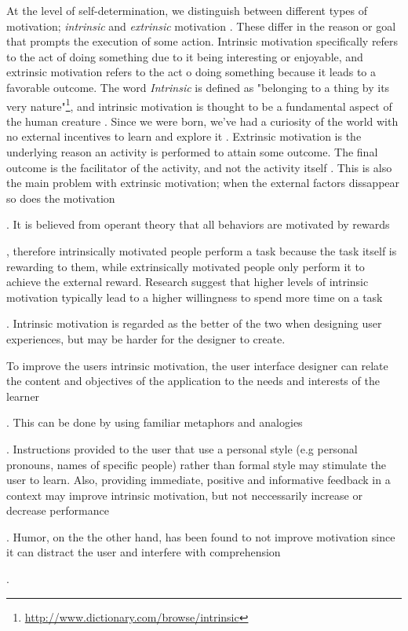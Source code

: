 At the level of self-determination, we distinguish between different types of motivation; \textit{intrinsic} and \textit{extrinsic} motivation \cite{Ryan2000a}. These differ in the reason or goal that prompts the execution of some action. Intrinsic motivation specifically refers to the act of doing something due to it being interesting or enjoyable, and extrinsic motivation refers to the act o doing something because it leads to a favorable outcome.  The word \textit{Intrinsic} is defined as "belonging to a thing by its very nature"\footnote{\url{http://www.dictionary.com/browse/intrinsic}}, and intrinsic motivation is thought to be a fundamental aspect of the human creature \cite{White1959}. Since we were born, we've had a curiosity of the world with no external incentives to learn and explore it \cite{Ryan2000a}. Extrinsic motivation is the underlying reason an activity is performed to attain some outcome. The final outcome is the facilitator of the activity, and not the activity itself \cite{Ryan2000a}. This is also the main problem with extrinsic motivation; when the external factors dissappear so does the motivation . It is believed from operant theory that all behaviors are motivated by rewards , therefore intrinsically motivated people perform a task because the task itself is rewarding to them, while extrinsically motivated people only perform it to achieve the external reward. Research suggest that higher levels of intrinsic motivation typically lead to a higher willingness to spend more time on a task . Intrinsic motivation is regarded as the better of the two when designing user experiences, but may be harder for the designer to create.

To improve the users intrinsic motivation, the user interface designer can relate the content and objectives of the application to the needs and interests of the learner . This can be done by using familiar metaphors and analogies . Instructions provided to the user that use a personal style (e.g personal pronouns, names of specific people) rather than formal style may stimulate the user to learn. Also, providing immediate, positive and informative feedback in a context may improve intrinsic motivation, but not neccessarily increase or decrease performance . Humor, on the the other hand, has been found to not improve motivation since it can distract the user and interfere with comprehension .

